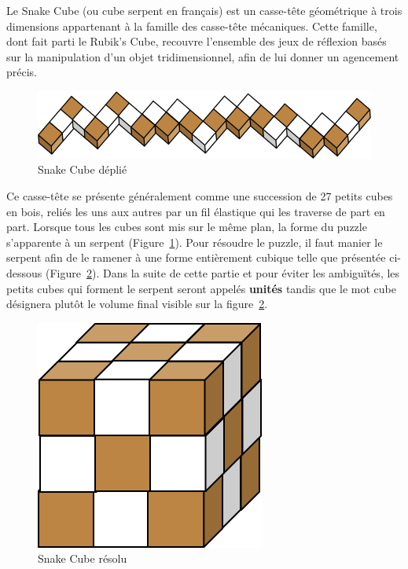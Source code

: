 Le Snake Cube (ou cube serpent en français) est un casse-tête géométrique à trois dimensions appartenant à la famille des casse-tête mécaniques. Cette famille, dont fait parti le Rubik’s Cube, recouvre l’ensemble des jeux de réflexion basés sur la manipulation d’un objet tridimensionnel, afin de lui donner un agencement précis.

\begin{figure}[h]
 \centering
 \includegraphics[scale=0.5,keepaspectratio=true]{img/snakeCubeFlat.png}
 \caption{Snake Cube déplié}
 \label{snakeFlat}
\end{figure}

Ce casse-tête se présente généralement comme une succession de 27 petits cubes en bois, reliés les uns aux autres par un fil élastique qui les traverse de part en part. Lorsque tous les cubes sont mis sur le même plan, la forme du puzzle s’apparente à un serpent  (Figure~\ref{snakeFlat}). Pour résoudre le puzzle, il faut manier le serpent afin de le ramener à une forme entièrement cubique telle que présentée ci-dessous (Figure~\ref{snakeSolved}). Dans la suite de cette partie et pour éviter les ambiguïtés, les petits cubes qui forment le serpent seront appelés \textbf{unités} tandis que le mot cube désignera plutôt le volume final visible sur la figure~\ref{snakeSolved}.

\begin{figure}[h]
 \centering
 \includegraphics[scale=0.5,keepaspectratio=true]{img/snakeCubeSolved.png}
 \caption{Snake Cube résolu}
 \label{snakeSolved}
\end{figure}

